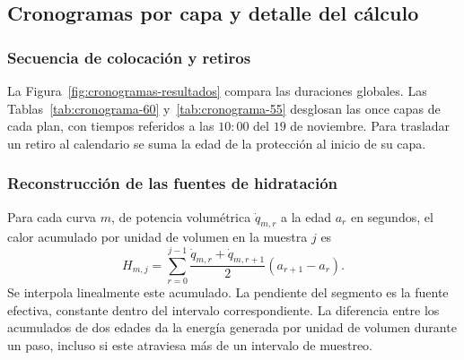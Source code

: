 \subsection{Cronogramas por capa y detalle del cálculo}
\label{an:detalles}

\subsubsection{Secuencia de colocación y retiros}
La Figura~\ref{fig:cronogramas-resultados} compara las duraciones globales. Las Tablas~\ref{tab:cronograma-60} y~\ref{tab:cronograma-55} desglosan las once capas de cada plan, con tiempos referidos a las $10{:}00$ del $19$ de noviembre. Para trasladar un retiro al calendario se suma la edad de la protección al inicio de su capa.




\subsubsection{Reconstrucción de las fuentes de hidratación}
Para cada curva $m$, de potencia volumétrica $\dot q_{m,r}$ a la edad $a_r$ en segundos, el calor acumulado por unidad de volumen en la muestra $j$ es
\begin{equation}
 H_{m,j}=\sum_{r=0}^{j-1}\frac{\dot q_{m,r}+\dot q_{m,r+1}}{2}(a_{r+1}-a_r).
\end{equation}
Se interpola linealmente este acumulado. La pendiente del segmento es la fuente efectiva, constante dentro del intervalo correspondiente. La diferencia entre los acumulados de dos edades da la energía generada por unidad de volumen durante un paso, incluso si este atraviesa más de un intervalo de muestreo.

